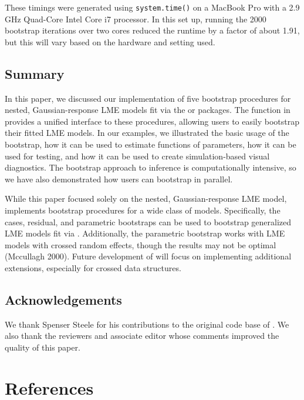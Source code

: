 \noindent These timings were generated using \texttt{system.time()} on a MacBook Pro with a 2.9 GHz Quad-Core Intel Core i7 processor. In this set up, running the 2000 bootstrap iterations over two cores reduced the runtime by a factor of about 1.91, but this will vary based on the hardware and setting used.

\hypertarget{summary}{%
\subsection{Summary}\label{summary}}

In this paper, we discussed our implementation of five bootstrap procedures for nested, Gaussian-response LME models fit via the  or  packages. The  function in  provides a unified interface to these procedures, allowing users to easily bootstrap their fitted LME models. In our examples, we illustrated the basic usage of the bootstrap, how it can be used to estimate functions of parameters, how it can be used for testing, and how it can be used to create simulation-based visual diagnostics. The bootstrap approach to inference is computationally intensive, so we have also demonstrated how users can bootstrap in parallel.

While this paper focused solely on the nested, Gaussian-response LME model,  implements bootstrap procedures for a wide class of models. Specifically, the cases, residual, and parametric bootstraps can be used to bootstrap generalized LME models fit via . Additionally, the parametric bootstrap works with LME models with crossed random effects, though the results may not be optimal (Mccullagh 2000). Future development of  will focus on implementing additional extensions, especially for crossed data structures.

\hypertarget{acknowledgements}{%
\subsection{Acknowledgements}\label{acknowledgements}}

We thank Spenser Steele for his contributions to the original code base of . We also thank the reviewers and associate editor whose comments improved the quality of this paper.

\hypertarget{references}{%
\section*{References}\label{references}}

